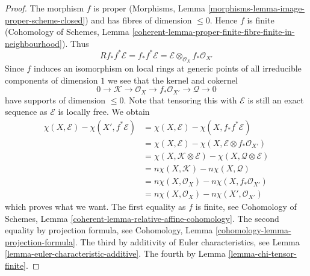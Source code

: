 \documentclass[10pt,a4paper]{amsart}
\theoremstyle{plain}
\theoremstyle{definition}
\theoremstyle{remark}
\numberwithin{equation}{subsection}
\begin{document}
\begin{proof}
The morphism $f$ is proper
(Morphisms, Lemma \ref{morphisms-lemma-image-proper-scheme-closed})
and has fibres of dimension $\leq 0$. Hence $f$ is finite
(Cohomology of Schemes, Lemma
\ref{coherent-lemma-proper-finite-fibre-finite-in-neighbourhood}).
Thus
$$
Rf_*f^*\mathcal{E} = f_*f^*\mathcal{E} =
\mathcal{E} \otimes_{\mathcal{O}_X} f_*\mathcal{O}_{X'}
$$
Since $f$ induces an isomorphism on local rings at generic points of
all irreducible components of dimension $1$ we see that the kernel
and cokernel
$$
0 \to \mathcal{K} \to \mathcal{O}_X \to f_*\mathcal{O}_{X'}
\to \mathcal{Q} \to 0
$$
have supports of dimension $\leq 0$. Note that tensoring this with
$\mathcal{E}$ is still an exact sequence as $\mathcal{E}$ is locally free.
We obtain
\begin{align*}
\chi(X, \mathcal{E}) - \chi(X', f^*\mathcal{E})
& =
\chi(X, \mathcal{E}) - \chi(X, f_*f^*\mathcal{E}) \\
& =
\chi(X, \mathcal{E}) - \chi(X, \mathcal{E} \otimes f_*\mathcal{O}_{X'}) \\
& =
\chi(X, \mathcal{K} \otimes \mathcal{E}) -
\chi(X, \mathcal{Q} \otimes \mathcal{E}) \\
& =
n\chi(X, \mathcal{K}) -
n\chi(X, \mathcal{Q}) \\
& =
n\chi(X, \mathcal{O}_X) - n\chi(X, f_*\mathcal{O}_{X'}) \\
& =
n\chi(X, \mathcal{O}_X) - n\chi(X', \mathcal{O}_{X'})
\end{align*}
which proves what we want. The first equality as $f$ is finite, see
Cohomology of Schemes, Lemma \ref{coherent-lemma-relative-affine-cohomology}.
The second equality by projection formula, see
Cohomology, Lemma \ref{cohomology-lemma-projection-formula}.
The third by additivity of Euler characteristics, see
Lemma \ref{lemma-euler-characteristic-additive}.
The fourth by Lemma \ref{lemma-chi-tensor-finite}.
\end{proof}
\end{document}
